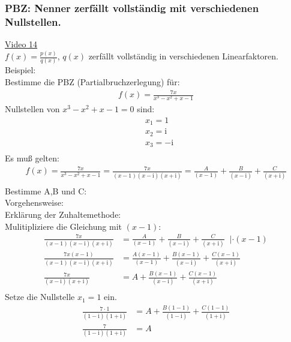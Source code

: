 \subsubsection{PBZ: Nenner zerfällt vollständig mit verschiedenen Nullstellen.}
\href{https://youtu.be/MYsd2kAmsk0}{Video 14}\\
$ f(x)=\frac{p(x)}{q(x)} $, $ q(x) $ zerfällt vollständig in verschiedenen Linearfaktoren.\\
Beispiel:\\
Bestimme die PBZ (Partialbruchzerlegung) für:\\
\begin{align*}
f(x)=\frac{7x}{x^3-x^2+x-1}
\end{align*}
Nullstellen von $ x^3-x^2+x-1=0 $ sind:\\
\begin{align*}
&x_1=1\\
&x_2=\mathrm{i}\\
&x_3=-\mathrm{i}\\
\end{align*}
Es muß gelten:\\
\begin{align*}
f(x)=\frac{7x}{x^3-x^2+x-1}=\frac{7x}{(x-1)(x-\mathrm{i})(x+\mathrm{i})}=\frac{A}{(x-1)}+\frac{B}{(x-\mathrm{i})}+\frac{C}{(x+\mathrm{i})}\\
\end{align*}
Bestimme A,B und C:\\
Vorgehensweise:\\
Erklärung der Zuhaltemethode:\\
Mulitipliziere die Gleichung mit $ (x-1) $:\\
\begin{align*}
\frac{7x}{(x-1)(x-\mathrm{i})(x+\mathrm{i})}&=\frac{A}{(x-1)}+\frac{B}{(x-\mathrm{i})}+\frac{C}{(x+\mathrm{i})}\;\;|\cdot (x-1)\\
\frac{7x(x-1)}{(x-1)(x-\mathrm{i})(x+\mathrm{i})}&=\frac{A(x-1)}{(x-1)}+\frac{B(x-1)}{(x-\mathrm{i})}+\frac{C(x-1)}{(x+\mathrm{i})}\\
\frac{7x}{(x-\mathrm{i})(x+\mathrm{i})}&=A+\frac{B(x-1)}{(x-\mathrm{i})}+\frac{C(x-1)}{(x+\mathrm{i})}\\
\end{align*}
Setze die Nullstelle $ x_1=1 $ ein.\\
\begin{align*}
\frac{7\cdot 1}{(1-\mathrm{i})(1+\mathrm{i})}&=A+\frac{B(1-1)}{(1-\mathrm{i})}+\frac{C(1-1)}{(1+\mathrm{i})}\\
\frac{7}{(1-\mathrm{i})(1+\mathrm{i})}&=A\\
\end{align*}
